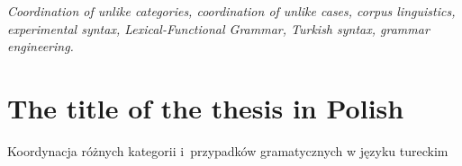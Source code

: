 \begin{small}
\textit{Coordination of unlike categories, coordination of unlike cases, corpus linguistics, experimental syntax, Lexical-Functional Grammar, Turkish syntax, grammar engineering.}
\end{small}
\section*{The title of the thesis in Polish}
Koordynacja różnych kategorii i~przypadków gramatycznych w języku tureckim